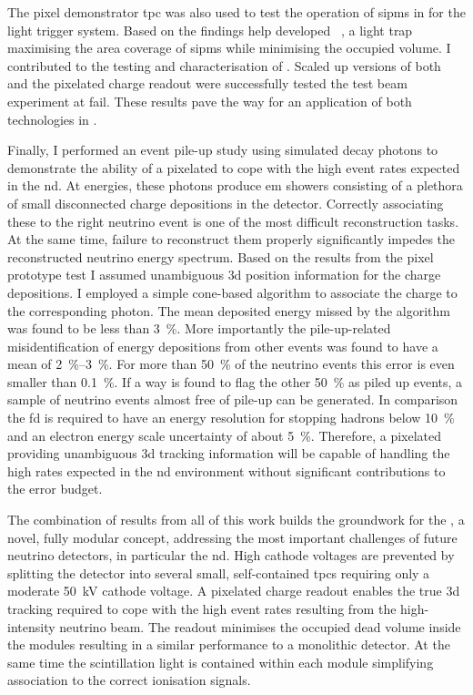 The pixel demonstrator \gls{tpc} was also used to test the operation of \glspl{sipm} in \lar{} for the light trigger system.
Based on the findings \gls{help} developed \AL{}~\cite{arclight}, a light trap maximising the area coverage of \glspl{sipm} while minimising the occupied volume.
I contributed to the testing and characterisation of \AL{}.
Scaled up versions of both \AL{} and the pixelated charge readout were successfully tested the \pixlar{} test beam experiment at \gls{fail}.
These results pave the way for an application of both technologies in \AC{}.

Finally, I performed an event pile-up study using simulated \Pgpz decay photons to demonstrate the ability of a pixelated \lartpc{} to cope with the high event rates expected in the \dune{} \gls{nd}.
At \dune{} energies, these photons produce \gls{em} showers consisting of a plethora of small disconnected charge depositions in the detector.
Correctly associating these to the right neutrino event is one of the most difficult reconstruction tasks.
At the same time, failure to reconstruct them properly significantly impedes the reconstructed neutrino energy spectrum.
Based on the results from the pixel prototype test I assumed unambiguous \gls{3d} position information for the charge depositions.
I employed a simple cone-based algorithm to associate the charge to the corresponding photon.
The mean deposited energy missed by the algorithm was found to be less than \SI{3}{\percent}.
More importantly the pile-up-related misidentification of energy depositions from other events was found to have a mean of \SIrange{2}{3}{\percent}.
For more than \SI{50}{\percent} of the neutrino events this error is even smaller than \SI{0.1}{\percent}.
If a way is found to flag the other \SI{50}{\percent} as piled up events, a sample of neutrino events almost free of pile-up can be generated.
In comparison the \gls{fd} is required to have an energy resolution for stopping hadrons below \SI{10}{\percent} and an electron energy scale uncertainty of about \SI{5}{\percent}.
Therefore, a pixelated \AC{} providing unambiguous \gls{3d} tracking information will be capable of handling the high rates expected in the \dune{} \gls{nd} environment without significant contributions to the error budget.

The combination of results from all of this work builds the groundwork for the \AC{}, a novel, fully modular \lartpc{} concept, addressing the most important challenges of future neutrino detectors, in particular the \dune{} \gls{nd}.
High cathode voltages are prevented by splitting the detector into several small, self-contained \glspl{tpc} requiring only a moderate \SI{50}{\kilo\volt} cathode voltage.
A pixelated charge readout enables the true \gls{3d} tracking required to cope with the high event rates resulting from the high-intensity neutrino beam.
The \AL{} readout minimises the occupied dead volume inside the modules resulting in a similar performance to a monolithic detector.
At the same time the scintillation light is contained within each module simplifying association to the correct ionisation signals.

